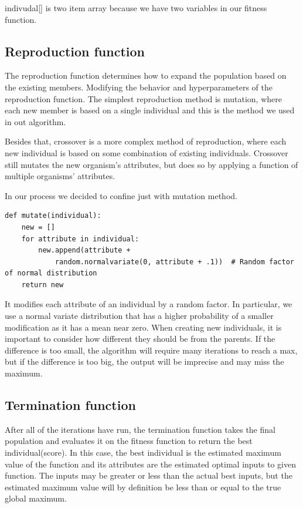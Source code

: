 \documentclass[a4paper, 12pt]{article}
\begin{document}
indivudal[] is two item array because we have two variables in our fitness function.

\subsection{Reproduction function}

The reproduction function determines how to expand the population based on the existing members. Modifying the behavior and hyperparameters of the reproduction function.
The simplest reproduction method is mutation, where each new member is based on a single individual and this is the method we used in out algorithm.

Besides that, crossover is a more complex method of reproduction, where each new individual is based on some combination of existing individuals. Crossover still mutates the new organism’s attributes, but does so by applying a function of multiple organisms’ attributes.

In our process we decided to confine just with mutation method. \\

\begin{lstlisting}
def mutate(individual):
	new = []
	for attribute in individual:
		new.append(attribute + 
			random.normalvariate(0, attribute + .1))  # Random factor of normal distribution
	return new
\end{lstlisting} 

It modifies each attribute of an individual by a random factor. In particular, we use a normal variate distribution that has a higher probability of a smaller modification as it has a mean near zero. When creating new individuals, it is important to consider how different they should be from the parents. If the difference is too small, the algorithm will require many iterations to reach a max, but if the difference is too big, the output will be imprecise and may miss the maximum.


\subsection{Termination function}

After all of the iterations have run, the termination function takes the final population and evaluates it on the fitness function to return the best individual(score). In this case, the best individual is the estimated maximum value of the function and its attributes are the estimated optimal inputs to given function. The inputs may be greater or less than the actual best inputs, but the estimated maximum value will by definition be less than or equal to the true global maximum.
\end{document}
